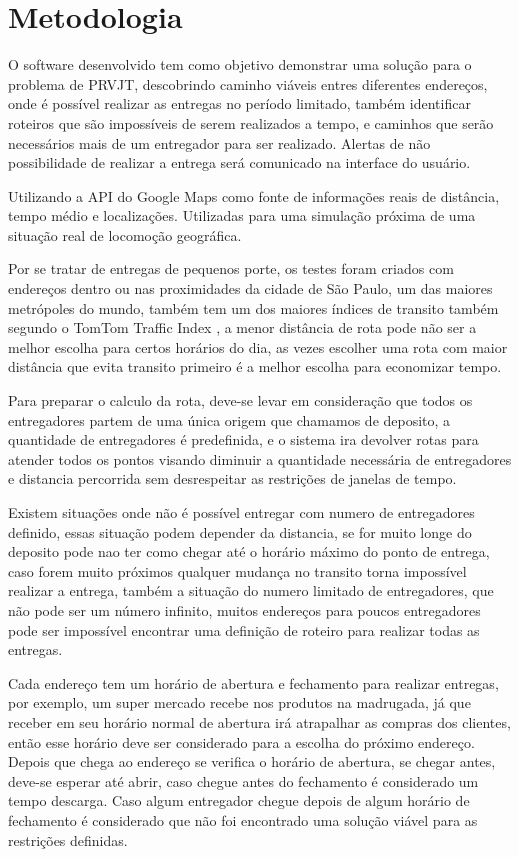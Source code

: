 \chapter{Metodologia}
O software desenvolvido tem como objetivo demonstrar uma solução para o problema de PRVJT, descobrindo caminho viáveis entres diferentes endereços, onde é possível realizar as entregas no período limitado, também identificar roteiros que são impossíveis de serem realizados a tempo, e caminhos que serão necessários mais de um entregador para ser realizado. Alertas de não possibilidade de realizar a entrega será comunicado na interface do usuário.

Utilizando a API do Google Maps\cite{GoogleMatrix} como fonte de informações reais de distância, tempo médio e localizações. Utilizadas para uma simulação próxima de uma situação real de locomoção geográfica.

Por se tratar de entregas de pequenos porte, os testes foram criados com endereços dentro ou nas proximidades da cidade de São Paulo, um das maiores metrópoles do mundo, também tem um dos maiores índices de transito também segundo o TomTom Traffic Index \cite{TomTom}, a menor distância de rota pode não ser a melhor escolha para certos horários do dia, as vezes escolher uma rota com maior distância que evita transito primeiro é a melhor escolha para economizar tempo.

Para preparar o calculo da rota, deve-se levar em consideração que todos os entregadores partem de uma única origem que chamamos de deposito, a quantidade de entregadores é predefinida, e o sistema ira devolver rotas para atender todos os pontos visando diminuir a quantidade necessária de entregadores e distancia percorrida sem desrespeitar as restrições de janelas de tempo.

Existem situações onde não é possível entregar com numero de entregadores definido, essas situação podem depender da distancia, se for muito longe do deposito pode nao ter como chegar até o horário máximo do ponto de entrega, caso forem muito próximos qualquer mudança no transito torna impossível realizar a entrega, também a situação do numero limitado de entregadores, que não pode ser um número infinito, muitos endereços para poucos entregadores pode ser impossível encontrar uma definição de roteiro para realizar todas as entregas.

Cada endereço tem um horário de abertura e fechamento para realizar entregas, por exemplo, um super mercado recebe nos produtos na madrugada, já que receber em seu horário normal de abertura irá atrapalhar as compras dos clientes, então esse horário deve ser considerado para a escolha do próximo endereço. 
Depois que chega ao endereço se verifica o horário de abertura, se chegar antes, deve-se esperar até abrir, caso chegue antes do fechamento é considerado um tempo descarga. Caso algum entregador chegue depois de algum horário de fechamento é considerado que não foi encontrado uma solução viável para as restrições definidas.


